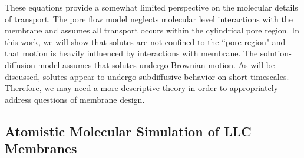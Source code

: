   These equations provide a somewhat limited perspective on the molecular details
  of transport. The pore flow model neglects molecular level interactions with the 
  membrane and assumes all transport occurs within the cylindrical pore region. In
  this work, we will show that solutes are not confined to the ``pore region" and 
  that motion is heavily influenced by interactions with membrane. The 
  solution-diffusion model assumes that solutes undergo Brownian motion. As will
  be discussed, solutes appear to undergo subdiffusive behavior on short timescales. 
  Therefore, we may need a more descriptive theory in order to appropriately address
  questions of membrane design.
  

  \subsection{Atomistic Molecular Simulation of LLC Membranes}  
  
